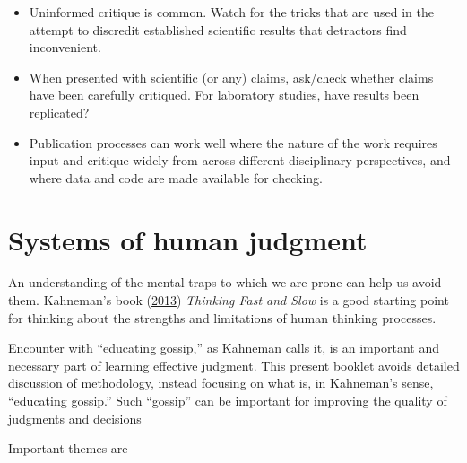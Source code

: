 \documentclass[
  10pt,
  b5paper]{book}
\providecommand{\tightlist}{%
  \setlength{\itemsep}{0pt}\setlength{\parskip}{0pt}}
\begin{document}
\begin{enumerate}
  \begin{itemize}
  \tightlist
  \item
    Uninformed critique is common. Watch for the
    tricks that are used in the attempt to discredit established
    scientific results that detractors find inconvenient.
  \item
    When presented with scientific (or any) claims, ask/check
    whether claims have been carefully critiqued. For laboratory
    studies, have results been replicated?
  \item
    Publication processes can work well where the nature of the
    work requires input and critique widely from across different
    disciplinary perspectives, and where data and code are made
    available for checking.
  \end{itemize}
\end{enumerate}

\mainmatter

\hypertarget{systems-of-human-judgment}{%
\chapter{Systems of human judgment}\label{systems-of-human-judgment}}

An understanding of the mental traps to which we are prone
can help us avoid them. Kahneman's book (\protect\hyperlink{ref-kahneman_2013}{2013})
\emph{Thinking Fast and Slow} is a good starting point for
thinking about the strengths and limitations of human
thinking processes.

Encounter with ``educating gossip,'' as Kahneman calls it, is an
important and necessary part of learning effective judgment.
This present booklet avoids detailed discussion of methodology,
instead focusing on what is, in Kahneman's sense, ``educating
gossip.'' Such ``gossip'' can be important for improving the quality
of judgments and decisions

Important themes are
\end{document}
